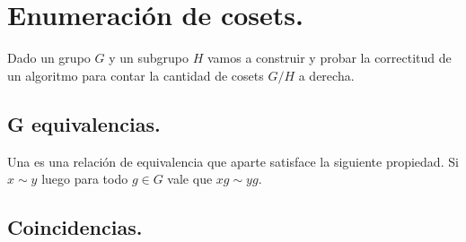 \documentclass[tesis.tex]{subfiles}
\begin{document}
\chapter{Enumeración de cosets.}

Dado un grupo  $G$ y un subgrupo $H$  vamos a construir y probar la correctitud de un algoritmo para contar la cantidad de cosets $G/H$ a derecha.



\section{G equivalencias.}

\begin{deff}
    Una  es una relación de equivalencia que aparte satisface la siguiente propiedad.
    Si $x \sim y$ luego para todo $g \in G$ vale que $xg \sim yg$.
\end{deff}


\section{Coincidencias.}
\end{document}
